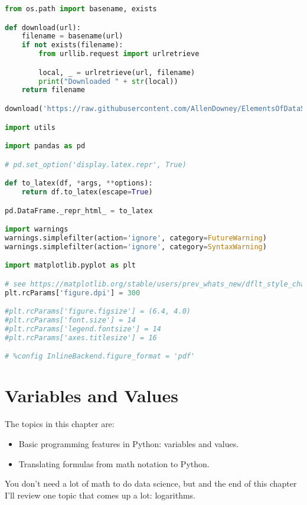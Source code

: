 \documentclass[
]{book}
\author{}
\date{}
\begin{document}
\frontmatter

\mainmatter
\begin{lstlisting}[language=Python]
from os.path import basename, exists

def download(url):
    filename = basename(url)
    if not exists(filename):
        from urllib.request import urlretrieve

        local, _ = urlretrieve(url, filename)
        print("Downloaded " + str(local))
    return filename

download('https://raw.githubusercontent.com/AllenDowney/ElementsOfDataScience/v1/utils.py')

import utils

import pandas as pd

# pd.set_option('display.latex.repr', True)

def to_latex(df, *args, **options):
    return df.to_latex(escape=True)

pd.DataFrame._repr_html_ = to_latex

import warnings
warnings.simplefilter(action='ignore', category=FutureWarning)
warnings.simplefilter(action='ignore', category=SyntaxWarning)

import matplotlib.pyplot as plt

# see https://matplotlib.org/stable/users/prev_whats_new/dflt_style_changes.html#figure-size-font-size-and-screen-dpi
plt.rcParams['figure.dpi'] = 300

#plt.rcParams['figure.figsize'] = (6.4, 4.0)
#plt.rcParams['font.size'] = 14
#plt.rcParams['legend.fontsize'] = 14
#plt.rcParams['axes.titlesize'] = 16

# %config InlineBackend.figure_format = 'pdf'
\end{lstlisting}

\chapter{Variables and Values}\label{variables-and-values}

The topics in this chapter are:

\begin{itemize}
\item
  Basic programming features in Python: variables and values.
\item
  Translating formulas from math notation to Python.
\end{itemize}

You don't need a lot of math to do data science, but and the end of this
chapter I'll review one topic that comes up a lot: logarithms.
\end{document}

